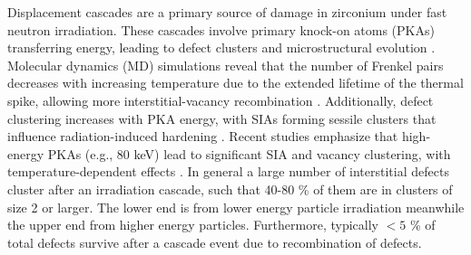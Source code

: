 \documentclass[12pt]{article}
\begin{document}
Displacement cascades are a primary source of damage in zirconium under fast neutron irradiation. These cascades involve primary knock-on atoms (PKAs) transferring energy, leading to defect clusters and microstructural evolution \cite{bacon1999computer, gao2001temperature, zhou2018molecular}. Molecular dynamics (MD) simulations reveal that the number of Frenkel pairs decreases with increasing temperature due to the extended lifetime of the thermal spike, allowing more interstitial-vacancy recombination \cite{gao2001temperature}. Additionally, defect clustering increases with PKA energy, with SIAs forming sessile clusters that influence radiation-induced hardening \cite{bacon2003md, zhou2018molecular}. Recent studies emphasize that high-energy PKAs (e.g., 80 keV) lead to significant SIA and vacancy clustering, with temperature-dependent effects \cite{zhou2018molecular}. In general a large number of interstitial defects cluster after an irradiation cascade, such that 40-80 \% of them are in clusters of size 2 or larger. The lower end is from lower energy particle irradiation meanwhile the upper end from higher energy particles. Furthermore, typically $< 5$ \% of total defects survive after a cascade event due to recombination of defects.  
\end{document}
